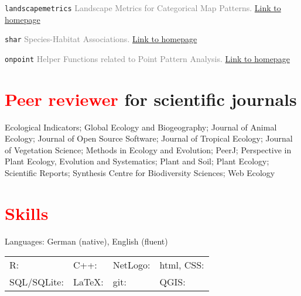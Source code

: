\documentclass[hidelinks]{report}
\begin{document}
\texttt{landscapemetrics} \textcolor{grey}{Landscape Metrics for Categorical Map Patterns.}
\hfill
\textcolor{blue}{\href{https://r-spatialecology.github.io/landscapemetrics/}{Link to homepage}}

\texttt{shar} \textcolor{grey}{Species-Habitat Associations.}
\hfill
\textcolor{blue}{\href{https://r-sptialecology.github.io/shar/}{Link to homepage}}

\texttt{onpoint} \textcolor{grey}{Helper Functions related to Point Pattern Analysis.}
\hfill
\textcolor{blue}{\href{https://r-spatialecology.github.io/onpoint/}{Link to homepage}}

\newpage


\section*{\textcolor{red}{Peer reviewer} for scientific journals \sout{\hfill}}

Ecological Indicators;
Global Ecology and Biogeography;
Journal of Animal Ecology;
Journal of Open Source Software;
Journal of Tropical Ecology;
Journal of Vegetation Science;
Methods in Ecology and Evolution;
PeerJ;
Perspective in Plant Ecology, Evolution and Systematics;
Plant and Soil;
Plant Ecology;
Scientific Reports;
Synthesis Centre for Biodiversity Sciences;
Web Ecology



\section*{\textcolor{red}{Skills} \sout{\hfill}}

Languages: German (native), English (fluent)

\begin{center}
	\begin{tabular}{l l l l}
		
		R: \textcolor{blue}{\faCircle \faCircle \faCircle \faCircle \faCircle} & 
		C++: \textcolor{blue}{\faCircle \faCircle \faCircle \faCircleO \faCircleO} & 
		NetLogo: \textcolor{blue}{\faCircle \faCircle \faCircleO \faCircleO \faCircleO} &
		html, CSS: \textcolor{blue}{\faCircle \faCircleO \faCircleO \faCircleO \faCircleO} \\
	
		SQL/SQLite: \textcolor{blue}{\faCircle \faCircleO \faCircleO \faCircleO \faCircleO} &
		LaTeX: \textcolor{blue}{\faCircle \faCircle \faCircle \faCircleO \faCircleO} &
		git: \textcolor{blue}{\faCircle \faCircle \faCircle \faCircleO \faCircleO} &
		QGIS: \textcolor{blue}{\faCircle \faCircle \faCircleO \faCircleO \faCircleO} \\

	\end{tabular}
\end{center}
\end{document}

